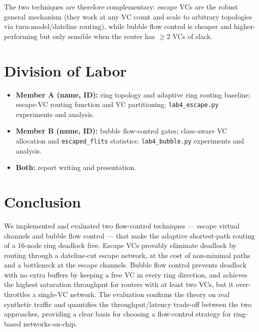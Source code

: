 \documentclass[11pt,a4paper]{article}
\begin{document}
The two techniques are therefore complementary: escape VCs are the robust
general mechanism (they work at any VC count and scale to arbitrary topologies
via turn-model/dateline routing), while bubble flow control is cheaper and
higher-performing but only sensible when the router has $\ge 2$ VCs of slack.

\section{Division of Labor}
\label{sec:labor}

\begin{itemize}[itemsep=2pt, topsep=2pt]
  \item \textbf{Member A (name, ID):} ring topology and adaptive ring routing
        baseline; escape-VC routing function and VC partitioning;
        \texttt{lab4\_escape.py} experiments and analysis.
  \item \textbf{Member B (name, ID):} bubble flow-control gates; class-aware
        VC allocation and \texttt{escaped\_flits} statistics;
        \texttt{lab4\_bubble.py} experiments and analysis.
  \item \textbf{Both:} report writing and presentation.
\end{itemize}

\section{Conclusion}
\label{sec:conclusion}

We implemented and evaluated two flow-control techniques --- escape virtual
channels and bubble flow control --- that make the adaptive shortest-path
routing of a 16-node ring deadlock free.  Escape VCs provably eliminate
deadlock by routing through a dateline-cut escape network, at the cost of
non-minimal paths and a bottleneck at the escape channels.  Bubble flow
control prevents deadlock with no extra buffers by keeping a free VC in every
ring direction, and achieves the highest saturation throughput for routers
with at least two VCs, but it over-throttles a single-VC network.  The
evaluation confirms the theory on real synthetic traffic and quantifies the
throughput/latency trade-off between the two approaches, providing a clear
basis for choosing a flow-control strategy for ring-based networks-on-chip.
\end{document}
